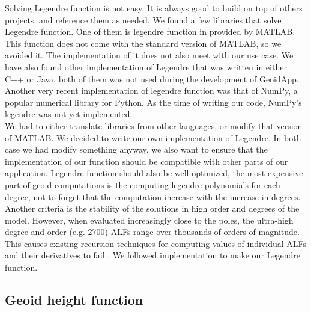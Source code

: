 Solving Legendre function is not easy. It is always good to build on top of others projects, and reference them as needed. We found a few libraries that solve Legendre function. One of them is legendre function in provided by MATLAB. This function does not come with the standard version of MATLAB, so we avoided it. The implementation of it does not also meet with our use case. We have also found other implementation of Legendre that was written in either C++ or Java, both of them was not used during the development of GeoidApp. Another very recent implementation of legendre function was that of NumPy, a popular numerical library for Python. As the time of writing our code, NumPy's legendre was not yet implemented.
\\
We had to either translate libraries from other languages, or modify that version of MATLAB. We decided to write our own implementation of Legendre. In both case we had modify something anyway, we also want to ensure that the implementation of our function should be compatible with other parts of our application. Legendre function should also be well optimized, the most expensive part of geoid computations is the computing legendre polynomials for each degree, not to forget that the computation increase with the increase in degrees. Another criteria is the stability of the solutions in high order and degrees of the model. However, when evaluated increasingly close to
the poles, the ultra-high degree and order (e.g. 2700)
ALFs range over thousands of orders of magnitude. This
causes existing recursion techniques for computing values
of individual ALFs and their derivatives to fail \cite{holmes}. We followed \cite{holmes} implementation to make our Legendre function.

 

\subsection{Geoid height function}

